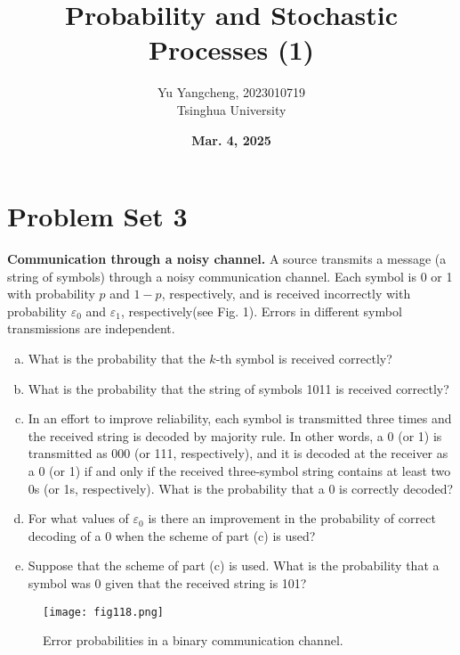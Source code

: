 \documentclass{article}
\title{Probability and Stochastic Processes (1)}
\author{Yu Yangcheng, 2023010719\\ Tsinghua University}
\date{\textbf{Mar. 4, 2025}}
\begin{document}
\maketitle

\section*{Problem Set 3}

\begin{question}
\textbf{Communication through a noisy channel.} A source transmits a message (a string of symbols) through a noisy communication channel. Each symbol is 0 or 1 with probability $p$ and $1 - p$, respectively, and is received incorrectly with probability $\varepsilon_0$ and $\varepsilon_1$, respectively(see Fig. 1). Errors in different symbol transmissions are independent.

\begin{enumerate}[(a)]
    \item What is the probability that the $k$-th symbol is received correctly?
    \item What is the probability that the string of symbols 1011 is received correctly?
    \item In an effort to improve reliability, each symbol is transmitted three times and the received string is decoded by majority rule. In other words, a 0 (or 1) is transmitted as 000 (or 111, respectively), and it is decoded at the receiver as a 0 (or 1) if and only if the received three-symbol string contains at least two 0s (or 1s, respectively). What is the probability that a 0 is correctly decoded?
    \item For what values of $\varepsilon_0$ is there an improvement in the probability of correct decoding of a 0 when the scheme of part (c) is used?
    \item Suppose that the scheme of part (c) is used. What is the probability that a symbol was 0 given that the received string is 101?
\end{enumerate}
\end{question}
\begin{figure}[h]
    \centering
    \texttt{[image: fig118.png]}  %
    \caption{Error probabilities in a binary communication channel.}
    \label{fig:example}
\end{figure}
\end{document}
